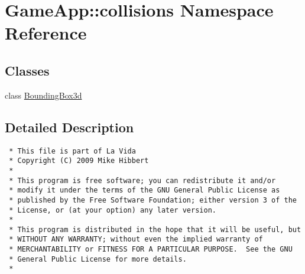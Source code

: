 \hypertarget{namespaceGameApp_1_1collisions}{
\section{GameApp::collisions Namespace Reference}
\label{namespaceGameApp_1_1collisions}
}


\subsection*{Classes}
\begin{CompactItemize}
\item 
class \hyperlink{classGameApp_1_1collisions_1_1BoundingBox3d}{BoundingBox3d}
\end{CompactItemize}


\subsection{Detailed Description}


\footnotesize\begin{verbatim}
 * This file is part of La Vida
 * Copyright (C) 2009 Mike Hibbert
 *
 * This program is free software; you can redistribute it and/or
 * modify it under the terms of the GNU General Public License as
 * published by the Free Software Foundation; either version 3 of the
 * License, or (at your option) any later version.
 *
 * This program is distributed in the hope that it will be useful, but
 * WITHOUT ANY WARRANTY; without even the implied warranty of
 * MERCHANTABILITY or FITNESS FOR A PARTICULAR PURPOSE.  See the GNU
 * General Public License for more details.
 *
\end{verbatim}
\normalsize
 